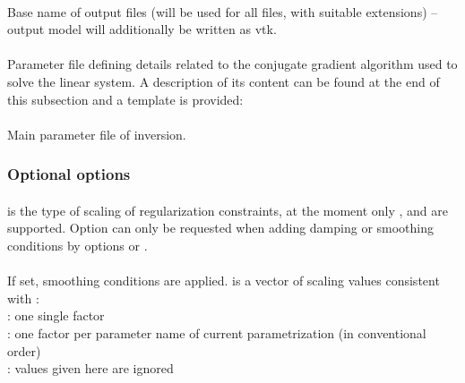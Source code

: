 \paragraph{}
Base name of output files (will be used for all files, with suitable extensions) -- output model will additionally be written as vtk.
\paragraph{}
Parameter file defining details related to the conjugate gradient algorithm used to solve the linear system.
A description of its content can be found at the end of this subsection and a template is provided:\\
\paragraph{}
Main parameter file of inversion.
\subsubsection{Optional options}
\paragraph{}
 is the type of scaling of regularization constraints, at the moment only 
,  and  are supported. 
Option  can only be requested when adding damping or smoothing conditions by options 
 or .
\paragraph{}
If set, smoothing conditions are applied.  is a vector of scaling values consistent 
with :\\
: one single factor\\
: one factor per parameter name of current parametrization (in conventional order)\\
 : values given here are ignored

